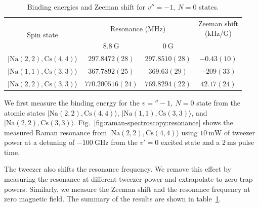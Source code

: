 \begin{table}
  \centering
  \begin{tabular}{|c|c|c|c|}
    \hline
    \multirow{2}{*}{Spin state}&\multicolumn{2}{c|}{Resonance (MHz)}&\multirowcell{2}{Zeeman shift\\(kHz/G)}\\\cline{2-3}
    {}&$8.8~\mathrm{G}$&$0~\mathrm{G}$&\\\hline
    $|\mathrm{Na(2, 2),Cs(4, 4)}\rangle$&$297.8472(28)$&$297.8510(28)$&$-0.43(10)$\\\hline
    $|\mathrm{Na(1, 1),Cs(3, 3)}\rangle$&$367.7892(25)$&$369.63(29)$&$-209(33)$\\\hline
    $|\mathrm{Na(2, 2),Cs(3, 3)}\rangle$&$770.200516(24)$&$769.8294(22)$&$42.17(24)$\\\hline
  \end{tabular}
  \caption[Binding energies for $v''=-1,\ N=0$ states]{
    Binding energies and Zeeman shift for $v''=-1,\ N=0$ states.
    \label{table:raman-spectroscopy:n0}}
\end{table}

We first measure the binding energy for the $v=''-1,\ N=0$ state
from the atomic states $|\mathrm{Na(2, 2),Cs(4, 4)}\rangle$, $|\mathrm{Na(1, 1),Cs(3, 3)}\rangle$,
and $|\mathrm{Na(2, 2),Cs(3, 3)}\rangle$.
Fig.~\ref{fig:raman-spectroscopy:resonance} shows the measured Raman resonance from
$|\mathrm{Na(2, 2),Cs(4, 4)}\rangle$ using $10~\mathrm{mW}$ of tweezer power at a detuning of
$-100~\mathrm{GHz}$ from the $v'=0$ excited state and a $2~\mathrm{ms}$ pulse time.

The tweezer also shifts the resonance frequency.
We remove this effect by measuring the resonance at different tweezer power
and extrapolate to zero trap powers.
Similarly, we measure the Zeeman shift and the resonance frequency at zero magnetic field.
The summary of the results are shown in table~\ref{table:raman-spectroscopy:n0}.


